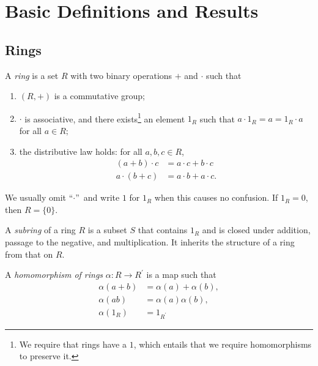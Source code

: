 \documentclass[a4paper,11pt,final,openany]{memoir}
\theoremstyle{nonumberplain}
\begin{document}
\clearpage


\pagestyle{ruled}  
 

\chapter{Basic Definitions and Results}

\section{Rings}

A \emph{ring}%
is a set $R$ with two binary operations $+$ and $\cdot$ such that

\begin{enumerate}
\item $(R,+)$ is a commutative group;

\item $\cdot$ is associative, and there exists\footnote{We require that rings
have a $1$, which entails that we require homomorphisms to preserve it.
\par
{}} an element $1_{R}$ such that $a\cdot1_{R}=a=1_{R}\cdot a$ for all $a\in
R;$

\item the distributive law holds: for all $a,b,c\in R$,
\begin{align*}
(a+b)\cdot c  &  =a\cdot c+b\cdot c\\
a\cdot(b+c)  &  =a\cdot b+a\cdot c\text{.}%
\end{align*}

\end{enumerate}

\noindent We usually omit \textquotedblleft$\cdot$\textquotedblright\ and
write $1$ for $1_{R}$ when this causes no confusion. If $1_{R}=0$, then
$R=\{0\}$.

A \emph{subring}%
of a ring $R$ is a subset $S$ that contains $1_{R}$ and is closed under
addition, passage to the negative, and multiplication. It inherits the
structure of a ring from that on $R$.

A \emph{homomorphism of rings}%
$\alpha\colon R\rightarrow R^{\prime}$ is a map such that
\begin{align*}
\alpha(a+b)&=\alpha(a)+\alpha(b),\\
\alpha(ab)&=\alpha(a)\alpha(b),\\
\alpha(1_{R})&=1_{R^{\prime}}%
\end{align*}
\end{document}
